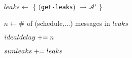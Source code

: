 \begin{bbox}[title={Algorithm $\msf{SimGetLeaks}$}]
	
	\begin{renumerate}
		\item $leaks \leftarrow$ \{ \Send (\texttt{get-leaks}) $\rightarrow \mathcal{\mathcal{A}'}$ \}
		\item $n \leftarrow \#$ of (schedule,...) messages in $leaks$
		\item $idealdelay \mathrel{+}= n$
		\item $simleaks \mathrel{+}= leaks$
	\end{renumerate}

\end{bbox}

